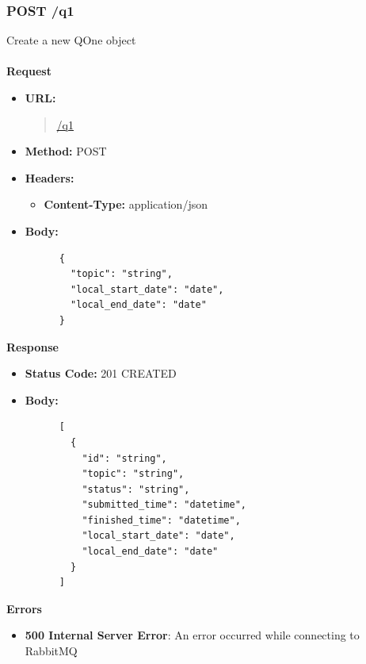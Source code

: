 \subsubsection{POST /q1}
Create a new QOne object \\\\
\textbf{Request}
\begin{itemize}
  \item \textbf{URL:}
  \begin{quote}
    \url{/q1}
  \end{quote}
  \item \textbf{Method:} POST
  \item \textbf{Headers:}
  \begin{itemize}
    \item \textbf{Content-Type:} application/json
  \end{itemize}
  \item \textbf{Body:}
    \begin{lstlisting}
      {
        "topic": "string",
        "local_start_date": "date",
        "local_end_date": "date"
      }
    \end{lstlisting}
\end{itemize}\leavevmode\newline
\textbf{Response}
\begin{itemize}
  \item \textbf{Status Code:} 201 CREATED
  \item \textbf{Body:}
    \begin{lstlisting}
      [
        {
          "id": "string",
          "topic": "string",
          "status": "string",
          "submitted_time": "datetime",
          "finished_time": "datetime",
          "local_start_date": "date",
          "local_end_date": "date"
        }
      ]
    \end{lstlisting}
\end{itemize}\leavevmode\newline
\textbf{Errors}
\begin{itemize}
  \item \textbf{500 Internal Server Error}: An error occurred while connecting to RabbitMQ
\end{itemize}

